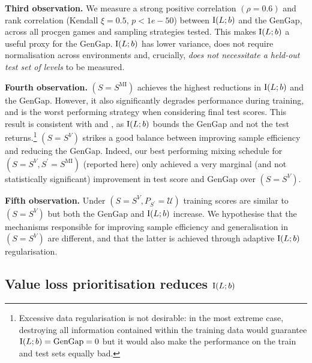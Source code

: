 \documentclass{article}
\theoremstyle{plain}
\theoremstyle{definition}
\theoremstyle{remark}
\begin{document}
    \textbf{Third observation.} We measure a strong positive correlation $(\rho=0.6)$ and rank correlation (Kendall $\xi=0.5$, $p<1e-50$) between $\text{I}(L;b)$ and the $\text{GenGap}$, across all procgen games and sampling strategies tested. This makes $\text{I}(L;b)$ a useful proxy for the $\text{GenGap}$. $\text{I}(L;b)$ has lower variance, does not require normalisation across environments and, crucially, \textit{does not necessitate a held-out test set of levels} to be measured.
    
    \textbf{Fourth observation.} $(S=S^{\text{MI}})$ achieves the highest reductions in $\text{I}(L;b)$ and the $\text{GenGap}$. However, it also significantly degrades performance during training, and is the worst performing strategy when considering final test scores. This result is consistent with  and , as $\text{I}(L;b)$ bounds the GenGap and not the test returns.\footnote{Excessive data regularisation is not desirable: in the most extreme case, destroying all information contained within the training data would guarantee $\text{I}(L;b) = \text{GenGap} = 0$ but it would also make the performance on the train and test sets equally bad.} $(S=S^V)$ strikes a good balance between improving sample efficiency and reducing the $\text{GenGap}$. Indeed, our best performing mixing schedule for $(S=S^V, S^\prime=S^{\text{MI}})$ (reported here) only achieved a very marginal (and not statistically significant) improvement in test score and $\text{GenGap}$ over $(S=S^V)$.
    
    \textbf{Fifth observation.} Under $(S=S^V, P_{S^\prime}=\mathcal{U})$ training scores are similar to $(S=S^V)$ but both the $\text{GenGap}$ and $\text{I}(L;b)$ increase. We hypothesise that the mechanisms responsible for improving sample efficiency and generalisation in $(S=S^V)$ are different, and that the latter is achieved through adaptive $\text{I}(L;b)$ regularisation.
\subsection{Value loss prioritisation reduces $\text{I}(L;b)$}
\end{document}
